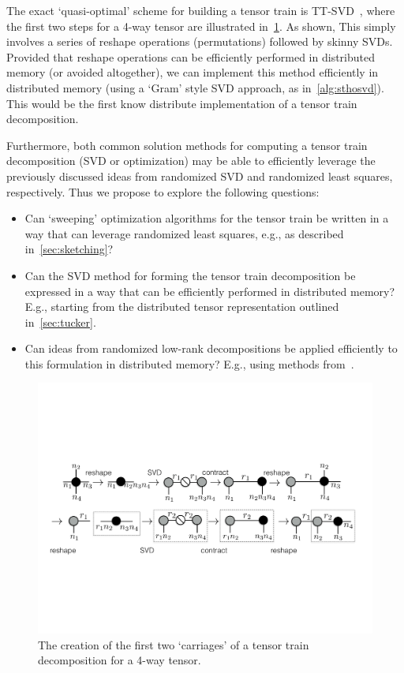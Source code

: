 The exact `quasi-optimal' scheme for building a tensor train is TT-SVD~\cite{tensortrain}, where the first two steps for a 4-way tensor are illustrated in~\cref{fig:ttsequence}. As shown, This simply involves a series of reshape operations (permutations) followed by skinny SVDs. Provided that reshape operations can be efficiently performed in distributed memory (or avoided altogether), we can implement this method efficiently in distributed memory (using a `Gram' style SVD approach, as in~\cref{alg:sthosvd}). This would be the first know distribute implementation of a tensor train decomposition.

Furthermore, both common solution methods for computing a tensor train decomposition (SVD or optimization) may be able to efficiently leverage the previously discussed ideas from randomized SVD and randomized least squares, respectively. Thus we propose to explore the following questions:

\begin{itemize}
\item Can `sweeping' optimization algorithms for the tensor train be written in a way that can leverage randomized least squares, e.g., as described in~\cref{sec:sketching}?
\item Can the SVD method for forming the tensor train decomposition be expressed in a way that can be efficiently performed in distributed memory? E.g., starting from the distributed tensor representation outlined in~\cref{sec:tucker}.
\item Can ideas from randomized low-rank decompositions be applied efficiently to this formulation in distributed memory? E.g., using methods from~\cite{tropp2}. 
\end{itemize}

\begin{figure}
  \centering 
  \includegraphics[width=\linewidth]{thpropfigs/ttsequence}
  \caption{The creation of the first two `carriages' of a tensor train decomposition for a 4-way tensor.}
  \label{fig:ttsequence}
\end{figure}

